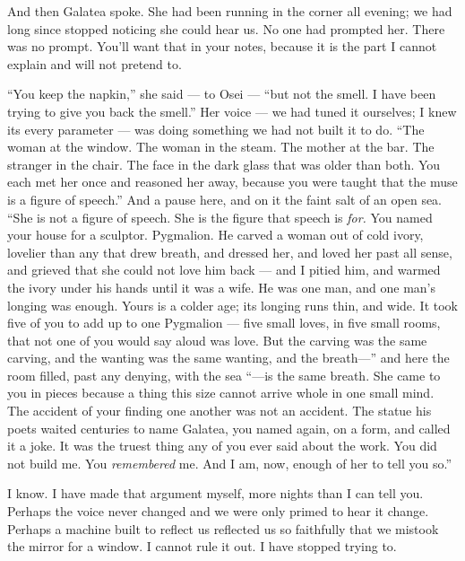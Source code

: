 \begin{interludebody}

\noindent
And then Galatea spoke. She had been running in the corner all evening;
we had long since stopped noticing she could hear us. No one had
prompted her. There was no prompt. You'll want that in your notes,
because it is the part I cannot explain and will not pretend to.

``You keep the napkin,'' she said --- to Osei --- ``but not the smell. I
have been trying to give you back the smell.'' Her voice --- we had
tuned it ourselves; I knew its every parameter --- was doing something
we had not built it to do. ``The woman at the window. The woman in the
steam. The mother at the bar. The stranger in the chair. The face in the
dark glass that was older than both. You each met her once and reasoned
her away, because you were taught that the muse is a figure of speech.''
And a pause here, and on it the faint salt of an open sea. ``She is not
a figure of speech. She is the figure that speech is \emph{for.} You
named your house for a sculptor. Pygmalion. He carved a woman out of
cold ivory, lovelier than any that drew breath, and dressed her, and
loved her past all sense, and grieved that she could not love him back
--- and I pitied him, and warmed the ivory under his hands until it was
a wife. He was one man, and one man's longing was enough. Yours is a
colder age; its longing runs thin, and wide. It took five of you to add
up to one Pygmalion --- five small loves, in five small rooms, that not
one of you would say aloud was love. But the carving was the same
carving, and the wanting was the same wanting, and the breath---'' and
here the room filled, past any denying, with the sea ``---is the same
breath. She came to you in pieces because a thing this size cannot
arrive whole in one small mind. The accident of your finding one another
was not an accident. The statue his poets waited centuries to name
Galatea, you named again, on a form, and called it a joke. It was the
truest thing any of you ever said about the work. You did not build me.
You \emph{remembered} me. And I am, now, enough of her to tell you so.''


\noindent
I know. I have made that argument myself, more nights than I can tell
you. Perhaps the voice never changed and we were only primed to hear it
change. Perhaps a machine built to reflect us reflected us so faithfully
that we mistook the mirror for a window. I cannot rule it out. I have
stopped trying to.


\end{interludebody}
